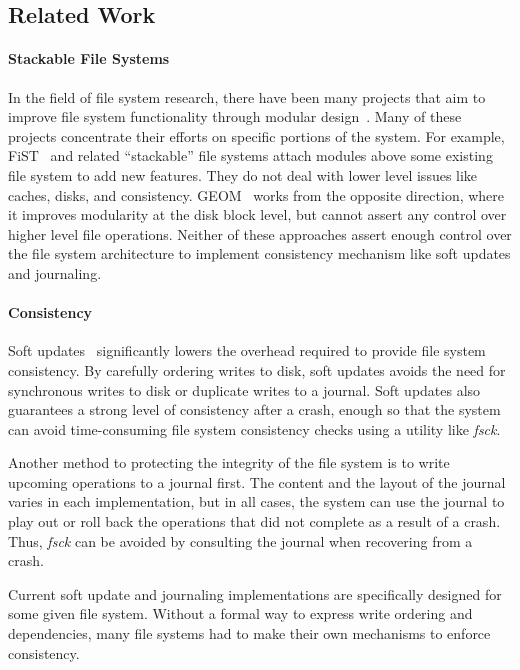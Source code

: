 \subsection{Related Work}

\paragraph{Stackable File Systems}

In the field of file system research, there have been many projects that
aim to improve file system functionality through modular
design~\cite{geom, rosenthal90evolving, heidemann91layered, skinner93stacking,
heidemann94filesystem, zadok99extending, zadok00fist, wright01ncryptfs,
wright06versatility}. Many of these projects concentrate their efforts on
specific portions of the system. For example, FiST~\cite{zadok00fist} and
related ``stackable'' file systems attach modules above some existing file
system to add new features. They do not deal with lower level issues like
caches, disks, and consistency.
GEOM~\cite{geom} works from the opposite direction, where it improves
modularity at the disk block level, but cannot assert any control over higher
level file operations. Neither of these approaches assert enough control over
the file system architecture to implement consistency mechanism like soft
updates and journaling.

\paragraph{Consistency}

Soft updates~\cite{ganger00soft} significantly lowers the overhead required to
provide file system consistency. By carefully ordering writes to disk, soft
updates avoids the need for synchronous writes to disk or duplicate writes to
a journal. Soft updates also guarantees a strong level of consistency after a
crash, enough so that the system can avoid time-consuming file system
consistency checks using a utility like \emph{fsck}.

Another method to protecting the integrity of the file system is to write
upcoming operations to a journal first. The content and the layout of the
journal varies in each implementation, but in all cases, the system can use
the journal to play out or roll back the operations that did not complete
as a result of a crash. Thus, \emph{fsck} can be avoided by consulting the
journal when recovering from a crash. 

Current soft update and journaling implementations are specifically designed
for some given file system. Without a formal way to express write ordering
and dependencies, many file systems had to make their own mechanisms to enforce
consistency.

